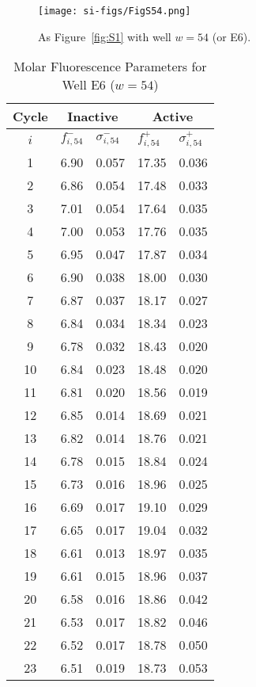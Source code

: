                 \begin{figure}
                    \centering
                    \texttt{[image: si-figs/FigS54.png]}
                    \caption{
                        As Figure~\ref{fig:S1} with well $w=54$ (or E6).
                    }
                \end{figure}
                \clearpage
    \begin{table}
        \caption{Molar Fluorescence Parameters for Well E6 ($w=54$)}
        \centering
        \begin{tabular}{c|ll|ll}
            Cycle & \multicolumn{2}{c|}{Inactive} & \multicolumn{2}{c}{Active} \\
            \hline
            $i$ & $f_{i,54}^{-}$ & $\sigma_{i,54}^{-}$ &  $f_{i,54}^{+}$ & $\sigma_{i,54}^{+}$ \\
            \hline
    1 & 6.90 & 0.057 & 17.35 & 0.036 \\
2 & 6.86 & 0.054 & 17.48 & 0.033 \\
3 & 7.01 & 0.054 & 17.64 & 0.035 \\
4 & 7.00 & 0.053 & 17.76 & 0.035 \\
5 & 6.95 & 0.047 & 17.87 & 0.034 \\
6 & 6.90 & 0.038 & 18.00 & 0.030 \\
7 & 6.87 & 0.037 & 18.17 & 0.027 \\
8 & 6.84 & 0.034 & 18.34 & 0.023 \\
9 & 6.78 & 0.032 & 18.43 & 0.020 \\
10 & 6.84 & 0.023 & 18.48 & 0.020 \\
11 & 6.81 & 0.020 & 18.56 & 0.019 \\
12 & 6.85 & 0.014 & 18.69 & 0.021 \\
13 & 6.82 & 0.014 & 18.76 & 0.021 \\
14 & 6.78 & 0.015 & 18.84 & 0.024 \\
15 & 6.73 & 0.016 & 18.96 & 0.025 \\
16 & 6.69 & 0.017 & 19.10 & 0.029 \\
17 & 6.65 & 0.017 & 19.04 & 0.032 \\
18 & 6.61 & 0.013 & 18.97 & 0.035 \\
19 & 6.61 & 0.015 & 18.96 & 0.037 \\
20 & 6.58 & 0.016 & 18.86 & 0.042 \\
21 & 6.53 & 0.017 & 18.82 & 0.046 \\
22 & 6.52 & 0.017 & 18.78 & 0.050 \\
23 & 6.51 & 0.019 & 18.73 & 0.053 \\

\end{tabular}
\end{table}
